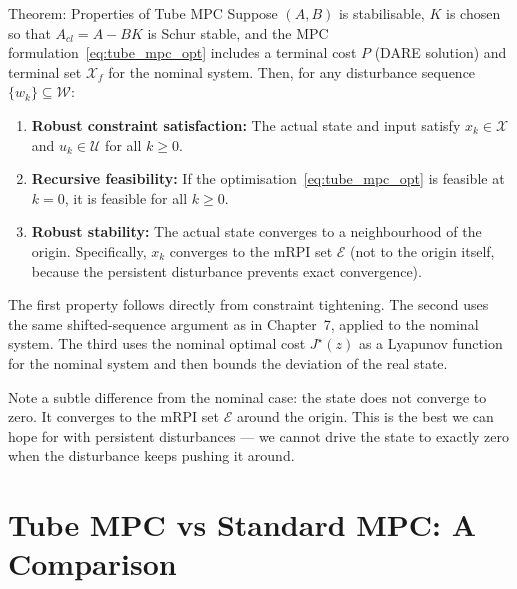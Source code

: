 \begin{summarybox}{Theorem: Properties of Tube MPC}
	Suppose $(A, B)$ is stabilisable, $K$ is chosen so that $A_{cl} = A - BK$ is Schur stable, and the MPC formulation~\eqref{eq:tube_mpc_opt} includes a terminal cost $P$ (DARE solution) and terminal set $\mathcal{X}_f$ for the nominal system. Then, for any disturbance sequence $\{w_k\} \subseteq \mathcal{W}$:
	\begin{enumerate}[noitemsep]
		\item \textbf{Robust constraint satisfaction:} The actual state and input satisfy $x_k \in \mathcal{X}$ and $u_k \in \mathcal{U}$ for all $k \ge 0$.
		\item \textbf{Recursive feasibility:} If the optimisation~\eqref{eq:tube_mpc_opt} is feasible at $k = 0$, it is feasible for all $k \ge 0$.
		\item \textbf{Robust stability:} The actual state converges to a neighbourhood of the origin. Specifically, $x_k$ converges to the mRPI set $\mathcal{E}$ (not to the origin itself, because the persistent disturbance prevents exact convergence).
	\end{enumerate}
\end{summarybox}

The first property follows directly from constraint tightening. The second uses the same shifted-sequence argument as in Chapter~7, applied to the nominal system. The third uses the nominal optimal cost $J^\star(z)$ as a Lyapunov function for the nominal system and then bounds the deviation of the real state.

Note a subtle difference from the nominal case: the state does not converge to zero. It converges to the mRPI set $\mathcal{E}$ around the origin. This is the best we can hope for with persistent disturbances --- we cannot drive the state to exactly zero when the disturbance keeps pushing it around.


\section{Tube MPC vs Standard MPC: A Comparison}
\label{sec:tube_comparison}

